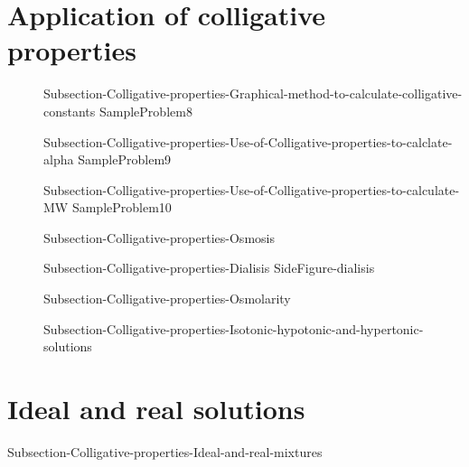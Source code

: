 \documentclass[main.tex]{subfiles}
\begin{document}
\section{Application of colligative properties} 
\sloppy \begin{description}
\item[] {Subsection-Colligative-properties-Graphical-method-to-calculate-colligative-constants}
{SampleProblem8}
\item[] {Subsection-Colligative-properties-Use-of-Colligative-properties-to-calclate-alpha}
{SampleProblem9}
\item[] {Subsection-Colligative-properties-Use-of-Colligative-properties-to-calculate-MW}
{SampleProblem10}
\item[] {Subsection-Colligative-properties-Osmosis}
\item[] {Subsection-Colligative-properties-Dialisis}
{SideFigure-dialisis}
\item[] {Subsection-Colligative-properties-Osmolarity}
\item[] {Subsection-Colligative-properties-Isotonic-hypotonic-and-hypertonic-solutions}
\end{description}

\section{Ideal and real solutions} 
{Subsection-Colligative-properties-Ideal-and-real-mixtures}
 
\end{document}
